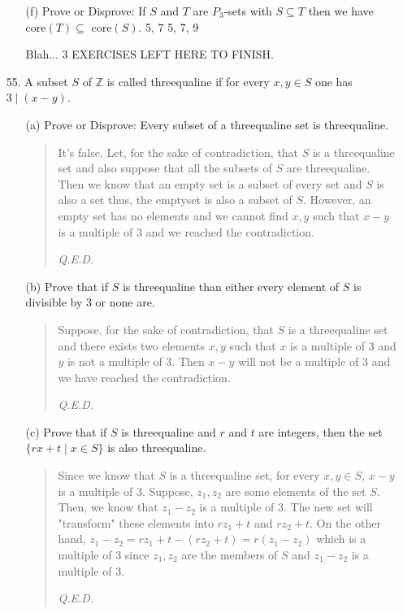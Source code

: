 \documentclass[12pt, a4paper]{article}                      %
\begin{document}
\begin{itemize}
\begin{itemize}
\item[]
\item[(f)]
Prove or Disprove: If $S$ and $T$ are $P_3$-sets with $S \subseteq T$ then we have $\mbox{core}(T) \subseteq \mbox{ core}(S)$.
5, 7  5, 7, 9

Blah... 3 EXERCISES LEFT HERE TO FINISH.
\end{itemize}

\item[]
\item[]

\item[55.]
A subset $S$ of $\mathbb{Z}$ is called threequaline if for every $x, y \in S$ one has $3 \mid (x - y)$.
\begin{itemize}
\item[(a)]
Prove or Disprove: Every subset of a threequaline set is threequaline.
\begin{quote}
It's false. Let, for the sake of contradiction, that $S$ is a threequaline set and also suppose that all the subsets of $S$ are threequaline. Then we know that an empty set is a subset of every set and $S$ is also a set thus, the emptyset is also a subset of $S$. However, an empty set has no elements and we cannot find $x, y$ such that $x - y$ is a multiple of 3 and we reached the contradiction.
\begin{flushright}
\textit{Q.E.D.}
\end{flushright}
\end{quote}

\item[]

\item[(b)]
Prove that if $S$ is threequaline than either every element of $S$ is divisible by 3 or none are.
\begin{quote}
Suppose, for the sake of contradiction, that $S$ is a threequaline set and there exists two elements $x, y$ such that $x$ is a multiple of 3 and $y$ is not a multiple of 3. Then $x - y$ will not be a multiple of 3 and we have reached the contradiction.
\begin{flushright}
\textit{Q.E.D.}
\end{flushright}
\end{quote}

\item[]

\item[(c)]
Prove that if $S$ is threequaline and $r$ and $t$ are integers, then the set $\{rx + t \mid x \in S\}$ is also threequaline.
\begin{quote}
Since we know that $S$ is a threequaline set, for every $x, y \in S$, $x - y$ is a multiple of 3. Suppose, $z_1, z_2$ are some elements of the set $S$. Then, we know that $z_1 - z_2$ is a multiple of 3. The new set will "transform" these elements into $rz_1 + t$ and $rz_2 + t$. On the other hand, $z_1 - z_2 = rz_1 + t - (rz_2 + t) = r(z_1 - z_2)$ which is a multiple of 3 since $z_1, z_2$ are the members of $S$ and $z_1 - z_2$ is a multiple of 3.
\begin{flushright}
\textit{Q.E.D.}
\end{flushright}
\end{quote}


\end{itemize}
\end{itemize}
\end{document}
